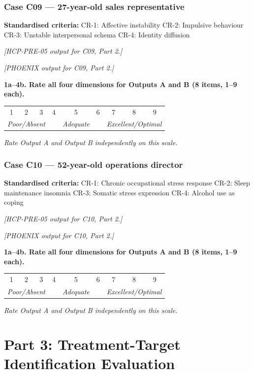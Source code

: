 \documentclass[11pt,a4paper]{article}
\makeatletter
\newcommand{\likertscale}[1]{%
\par\vspace{0.15em}%
\noindent\begin{tcolorbox}[colback=ScaleBG,colframe=BorderGrey,boxrule=0.4pt,arc=1mm,left=5pt,right=5pt,top=4pt,bottom=4pt]%
\small\textbf{\color{SlateMid}#1}\\[0.25em]%
\begin{tabular}{@{}*{9}{c}@{}}%
1 & 2 & 3 & 4 & 5 & 6 & 7 & 8 & 9 \\%
\multicolumn{3}{l}{\tiny\itshape Poor/Absent} & & \multicolumn{1}{c}{\tiny\itshape Adequate} & & \multicolumn{3}{r}{\tiny\itshape Excellent/Optimal}%
\end{tabular}%
\quad\textit{Rate Output A and Output B independently on this scale.}%
\end{tcolorbox}\vspace{0.1em}}
\makeatother
\begin{document}
\subsubsection*{Case C09 --- 27-year-old sales representative}
\begin{vignettebox}
\small\textbf{Standardised criteria:} CR-1: Affective instability \quad CR-2: Impulsive behaviour \quad CR-3: Unstable interpersonal schema \quad CR-4: Identity diffusion
\end{vignettebox}
\begin{outputAbox}\small\textit{[HCP-PRE-05 output for C09, Part 2.]}\end{outputAbox}
\begin{outputBbox}\small\textit{[PHOENIX output for C09, Part 2.]}\end{outputBbox}
\begin{ratingbox}
\likertscale{1a--4b. Rate all four dimensions for Outputs A and B (8 items, 1--9 each).}
\end{ratingbox}

\vspace{0.4em}

\subsubsection*{Case C10 --- 52-year-old operations director}
\begin{vignettebox}
\small\textbf{Standardised criteria:} CR-1: Chronic occupational stress response \quad CR-2: Sleep maintenance insomnia \quad CR-3: Somatic stress expression \quad CR-4: Alcohol use as coping
\end{vignettebox}
\begin{outputAbox}\small\textit{[HCP-PRE-05 output for C10, Part 2.]}\end{outputAbox}
\begin{outputBbox}\small\textit{[PHOENIX output for C10, Part 2.]}\end{outputBbox}
\begin{ratingbox}
\likertscale{1a--4b. Rate all four dimensions for Outputs A and B (8 items, 1--9 each).}
\end{ratingbox}

\newpage

\section{Part 3: Treatment-Target Identification Evaluation}
\label{sec:part3}
\end{document}
